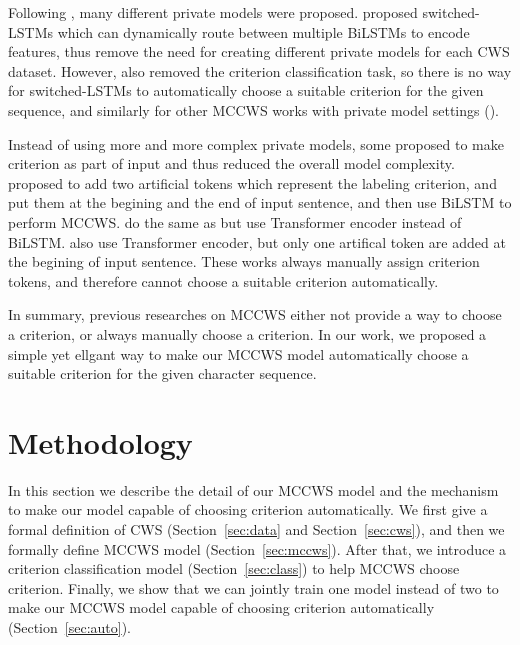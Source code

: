 \documentclass[11pt]{article}
\begin{document}
Following \citep{chen-etal-2017-adversarial}, many different private models were proposed.
\citep{Gong-2019-switch} proposed switched-LSTMs which can dynamically route between multiple BiLSTMs to encode features, thus remove the need for creating different private models for each CWS dataset.
However, \citep{Gong-2019-switch} also removed the criterion classification task, so there is no way for switched-LSTMs to automatically choose a suitable criterion for the given sequence, and similarly for other MCCWS works with private model settings (\citep{huang-etal-2020-towards,qiu-etal-2020-concise}).

Instead of using more and more complex private models, some proposed to make criterion as part of input and thus reduced the overall model complexity.
\citep{He-2019-effective} proposed to add two artificial tokens which represent the labeling criterion, and put them at the begining and the end of input sentence, and then use BiLSTM to perform MCCWS.
\citep{huang-etal-2020-joint-multiple} do the same as \citep{He-2019-effective} but use Transformer encoder \citep{vaswani-2017-attention} instead of BiLSTM.
\citep{ke-etal-2021-pre} also use Transformer encoder, but only one artifical token are added at the begining of input sentence.
These works always manually assign criterion tokens, and therefore cannot choose a suitable criterion automatically.

In summary, previous researches on MCCWS either not provide a way to choose a criterion, or always manually choose a criterion.
In our work, we proposed a simple yet ellgant way to make our MCCWS model automatically choose a suitable criterion for the given character sequence.

\section{Methodology}

In this section we describe the detail of our MCCWS model and the mechanism to make our model capable of choosing criterion automatically.
We first give a formal definition of CWS (Section~\ref{sec:data} and Section~\ref{sec:cws}), and then we formally define MCCWS model (Section~\ref{sec:mccws}).
After that, we introduce a criterion classification model (Section~\ref{sec:class}) to help MCCWS choose criterion.
Finally, we show that we can jointly train one model instead of two to make our MCCWS model capable of choosing criterion automatically (Section~\ref{sec:auto}).
\end{document}
